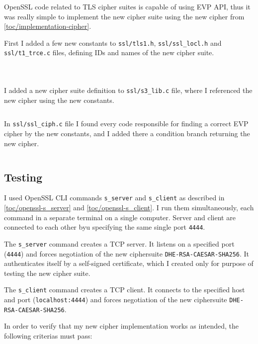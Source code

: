 OpenSSL code related to TLS cipher suites is capable of using EVP API, thus it was really simple to implement the new cipher suite using the new cipher from \autoref{toc/implementation-cipher}.

First I added a few new constants to \texttt{ssl/tls1.h}, \texttt{ssl/ssl\_locl.h} and \texttt{ssl/t1\_trce.c} files, defining IDs and names of the new cipher suite.

\inputminted{c}{code/openssl/ssl/tls1.h}
\inputminted{c}{code/openssl/ssl/ssl_locl.h}
\inputminted{c}{code/openssl/ssl/t1_trce.c}

I added a new cipher suite definition to \texttt{ssl/s3\_lib.c} file, where I referenced the new cipher using the new constants.

\inputminted{c}{code/openssl/ssl/s3_lib.c}

In \texttt{ssl/ssl\_ciph.c} file I found every code responsible for finding a correct EVP cipher by the new constants, and I added there a condition branch returning the new cipher.

\inputminted{c}{code/openssl/ssl/ssl_ciph.c}

\subsection{Testing}

I used OpenSSL CLI commands \texttt{s\_server} and \texttt{s\_client} as described in \autoref{toc/openssl-s_server} and \autoref{toc/openssl-s_client}. I run them simultaneously, each command in a separate terminal on a single computer. Server and client are connected to each other byu specifying the same single port \texttt{4444}.

The \texttt{s\_server} command creates a TCP server. It listens on a specified port (\texttt{4444}) and forces negotiation of the new ciphersuite \texttt{DHE-RSA-CAESAR-SHA256}. It authenticates itself by a self-signed certificate, which I created only for purpose of testing the new cipher suite.

The \texttt{s\_client} command creates a TCP client. It connects to the specified host and port (\texttt{localhost:4444}) and forces negotiation of the new ciphersuite \texttt{DHE-RSA-CAESAR-SHA256}.

In order to verify that my new cipher implementation works as intended, the following criterias must pass:

